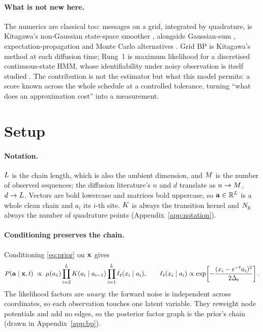 \documentclass{article}
\theoremstyle{definition}
\theoremstyle{plain}
\begin{document}
\paragraph{What is not new here.} The numerics are classical too: messages on a grid, integrated by
quadrature, is Kitagawa's non-Gaussian state-space smoother \citep{kitagawa1987}, alongside
Gaussian-sum \citep{alspach1972}, expectation-propagation \citep{minka2001} and Monte Carlo
\citep{gordon1993} alternatives \citep[see][]{sarkka2013}. Grid BP is Kitagawa's method at each
diffusion time; Rung~1 is maximum likelihood for a discretised continuous-state HMM, whose
identifiability under noisy observation is itself studied \citep{allman2009}. The contribution is
not the estimator but what this model permits: a score known across the whole schedule at a
controlled tolerance, turning ``what does an approximation cost'' into a measurement.

\section{Setup}
\label{sec:setting}

\paragraph{Notation.} $L$ is the chain length, which is also the ambient dimension, and
$M$ is the number of observed sequences; the diffusion literature's $n$ and $d$ translate as
$n\to M$, $d\to L$. Vectors are bold lowercase and matrices bold uppercase, so
$\mathbf{a}\in\mathbb{R}^{L}$ is a whole clean chain and $a_i$ its $i$-th site. $K$ is always the
transition kernel and $N_{\mathrm{g}}$ always the number of quadrature points
(Appendix~\ref{app:notation}).



\paragraph{Conditioning preserves the chain.} Conditioning \eqref{eq:prior} on $\mathbf{x}$ gives
\begin{equation}
\label{eq:posterior}
P(\mathbf{a} \mid \mathbf{x},t) \;\propto\;
\mu(a_1)\prod_{i=2}^{L} K(a_i\mid a_{i-1})
\prod_{i=1}^{L} \ell_t(x_i \mid a_i),
\qquad
\ell_t(x_i\mid a_i) \propto \exp\!\left[-\frac{(x_i - e^{-t}a_i)^2}{2\Delta_t}\right].
\end{equation}
The likelihood factors are \emph{unary}: the forward noise is independent across coordinates, so
each observation touches one latent variable. They reweight node potentials and add no edges, so
the posterior factor graph is the prior's chain (drawn in Appendix~\ref{app:bp}).
\end{document}
